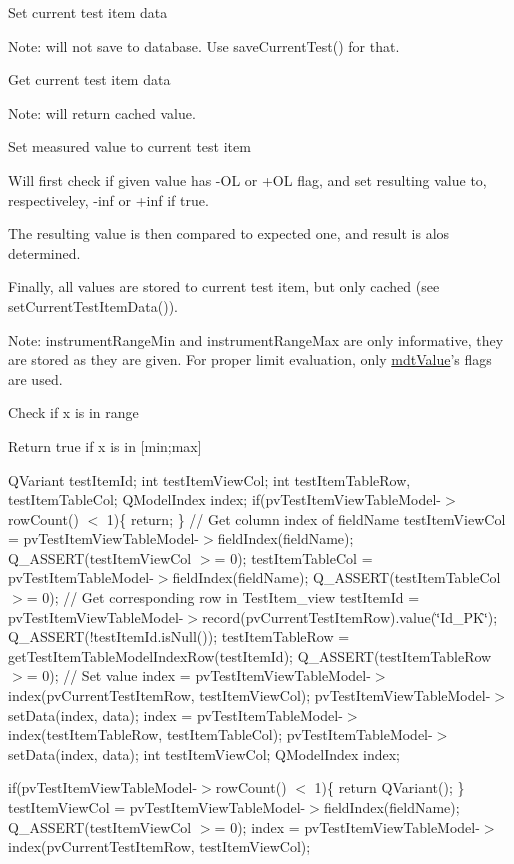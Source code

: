 Set current test item data

Note\-: will not save to database. Use save\-Current\-Test() for that.

Get current test item data

Note\-: will return cached value.

Set measured value to current test item

Will first check if given value has -\/\-O\-L or +\-O\-L flag, and set resulting value to, respectiveley, -\/inf or +inf if true.

The resulting value is then compared to expected one, and result is alos determined.

Finally, all values are stored to current test item, but only cached (see set\-Current\-Test\-Item\-Data()).

Note\-: instrument\-Range\-Min and instrument\-Range\-Max are only informative, they are stored as they are given. For proper limit evaluation, only \hyperlink{classmdt_value}{mdt\-Value}'s flags are used.

Check if x is in range

Return true if x is in \mbox{[}min;max\mbox{]}

Q\-Variant test\-Item\-Id; int test\-Item\-View\-Col; int test\-Item\-Table\-Row, test\-Item\-Table\-Col; Q\-Model\-Index index; if(pv\-Test\-Item\-View\-Table\-Model-\/$>$row\-Count() $<$ 1)\{ return; \} // Get column index of field\-Name test\-Item\-View\-Col = pv\-Test\-Item\-View\-Table\-Model-\/$>$field\-Index(field\-Name); Q\-\_\-\-A\-S\-S\-E\-R\-T(test\-Item\-View\-Col $>$= 0); test\-Item\-Table\-Col = pv\-Test\-Item\-Table\-Model-\/$>$field\-Index(field\-Name); Q\-\_\-\-A\-S\-S\-E\-R\-T(test\-Item\-Table\-Col $>$= 0); // Get corresponding row in Test\-Item\-\_\-view test\-Item\-Id = pv\-Test\-Item\-View\-Table\-Model-\/$>$record(pv\-Current\-Test\-Item\-Row).value(\char`\"{}\-Id\-\_\-\-P\-K\char`\"{}); Q\-\_\-\-A\-S\-S\-E\-R\-T(!test\-Item\-Id.is\-Null()); test\-Item\-Table\-Row = get\-Test\-Item\-Table\-Model\-Index\-Row(test\-Item\-Id); Q\-\_\-\-A\-S\-S\-E\-R\-T(test\-Item\-Table\-Row $>$= 0); // Set value index = pv\-Test\-Item\-View\-Table\-Model-\/$>$index(pv\-Current\-Test\-Item\-Row, test\-Item\-View\-Col); pv\-Test\-Item\-View\-Table\-Model-\/$>$set\-Data(index, data); index = pv\-Test\-Item\-Table\-Model-\/$>$index(test\-Item\-Table\-Row, test\-Item\-Table\-Col); pv\-Test\-Item\-Table\-Model-\/$>$set\-Data(index, data); int test\-Item\-View\-Col; Q\-Model\-Index index;

if(pv\-Test\-Item\-View\-Table\-Model-\/$>$row\-Count() $<$ 1)\{ return Q\-Variant(); \} test\-Item\-View\-Col = pv\-Test\-Item\-View\-Table\-Model-\/$>$field\-Index(field\-Name); Q\-\_\-\-A\-S\-S\-E\-R\-T(test\-Item\-View\-Col $>$= 0); index = pv\-Test\-Item\-View\-Table\-Model-\/$>$index(pv\-Current\-Test\-Item\-Row, test\-Item\-View\-Col);

